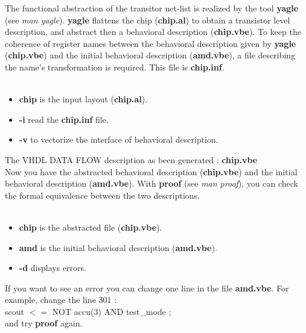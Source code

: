 \documentclass[11pt,a4]{article}
\begin{document}
The functional abstraction of the transitor net-list is realized by the tool
{\bf yagle} (see {\it man yagle}). {\bf yagle} flattens the chip ({\bf chip.al})
to obtain a transistor level description, and abstract then a behavioral description ({\bf chip.vbe}).
To keep the coherence of register names between the behavioral description
given by {\bf yagle} ({\bf chip.vbe}) and the initial behavioral description
({\bf amd.vbe}), a file describing the name's transformation is required.
This file is {\bf chip.inf}.\\
\\
\begin{itemize}
\item {\bf chip}	is the input layout ({\bf chip.al}).
\item {\bf -i}		read the {\bf chip.inf} file.   
\item {\bf -v}		to vectorize the interface of behavioral description.
\end{itemize}

The VHDL DATA FLOW description as been generated : {\bf chip.vbe}\\

Now you have the abstracted behavioral description ({\bf chip.vbe})
and the initial behavioral description ({\bf amd.vbe}).
With {\bf proof} (see {\it man proof}), you can check the formal equivalence
between the two descriptions.\\
\\
\begin{itemize}
\item {\bf chip}	is the abstracted file ({\bf chip.vbe}).
\item {\bf amd}		is the initial behavioral description ({\bf amd.vbe}).
\item {\bf -d}		displays errors.
\end{itemize}

If you want to see an error you can change one line in the file {\bf amd.vbe}.
For example, change the line 301 :\\
 scout $<=$ NOT accu(3) AND test\_mode ;\\
and try {\bf proof} again.
\end{document}
